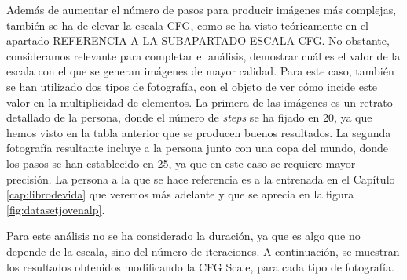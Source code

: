 Además de aumentar el número de pasos para producir imágenes más complejas, también se ha de elevar la escala CFG, como se ha visto teóricamente en el apartado REFERENCIA A LA SUBAPARTADO ESCALA CFG. No obstante, consideramos relevante para completar el análisis, demostrar cuál es el valor de la escala con el que se generan imágenes de mayor calidad. Para este caso, también se han utilizado dos tipos de fotografía, con el objeto de ver cómo incide este valor en la multiplicidad de elementos. La primera de las imágenes es un retrato detallado de la persona, donde el número de \textit{steps} se ha fijado en 20, ya que hemos visto en la tabla anterior que se producen buenos resultados. La segunda fotografía resultante incluye a la persona junto con una copa del mundo, donde los pasos se han establecido en 25, ya que en este caso se requiere mayor precisión. La persona a la que se hace referencia es a la entrenada en el Capítulo \ref{cap:librodevida} que veremos más adelante y que se aprecia en la figura \ref*{fig:datasetjovenalp}.

Para este análisis no se ha considerado la duración, ya que es algo que no depende de la escala, sino del número de iteraciones. A continuación, se muestran los resultados obtenidos modificando la CFG Scale, para cada tipo de fotografía.

